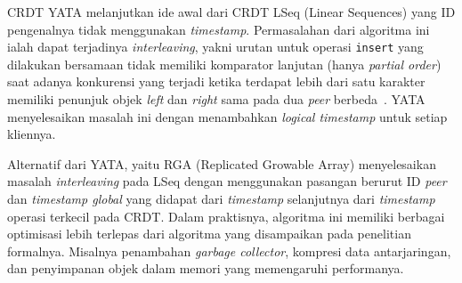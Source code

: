 CRDT YATA melanjutkan ide awal dari CRDT LSeq (Linear Sequences) yang ID pengenalnya tidak menggunakan \textit{timestamp}. Permasalahan dari algoritma ini ialah dapat terjadinya \textit{interleaving}, yakni urutan untuk operasi \texttt{insert} yang dilakukan bersamaan tidak memiliki komparator lanjutan (hanya \textit{partial order}) saat adanya konkurensi yang terjadi ketika terdapat lebih dari satu karakter memiliki penunjuk objek \textit{left} dan \textit{right} sama pada dua \textit{peer} berbeda~\citep{kleppmann2019interleaving, nedelec2013lseq}. YATA menyelesaikan masalah ini dengan menambahkan \textit{logical timestamp} untuk setiap kliennya.

Alternatif dari YATA, yaitu RGA (Replicated Growable Array) menyelesaikan masalah \textit{interleaving} pada LSeq dengan menggunakan pasangan berurut ID \textit{peer} dan \textit{timestamp global} yang didapat dari \textit{timestamp} selanjutnya dari \textit{timestamp} operasi terkecil pada CRDT. Dalam praktisnya, algoritma ini memiliki berbagai optimisasi lebih terlepas dari algoritma yang disampaikan pada penelitian formalnya. Misalnya penambahan \textit{garbage collector}, kompresi data antarjaringan, dan penyimpanan objek dalam memori yang memengaruhi performanya.